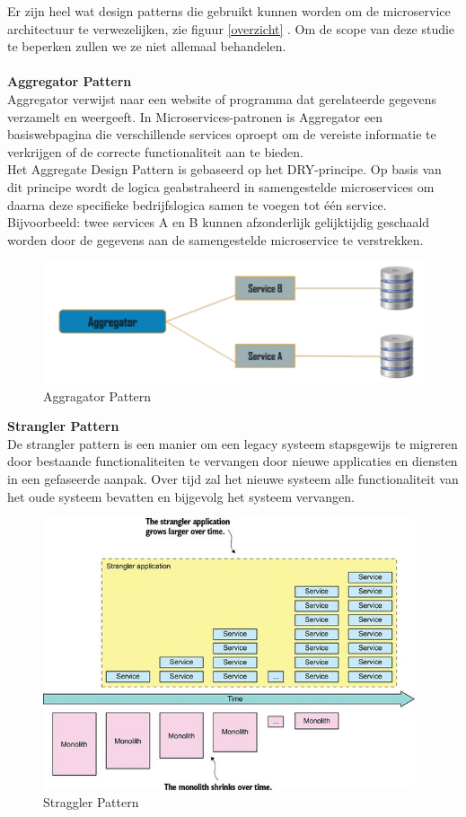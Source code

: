 Er zijn heel wat design patterns die gebruikt kunnen worden om de microservice architectuur te verwezelijken, zie figuur \ref{overzicht} . Om de scope van deze studie te beperken zullen we ze niet allemaal behandelen.\\ \\
\textbf{Aggregator Pattern}\\
Aggregator verwijst naar een website of programma dat gerelateerde gegevens verzamelt en weergeeft. In Microservices-patronen is Aggregator een basiswebpagina die verschillende services oproept om de vereiste informatie te verkrijgen of de correcte functionaliteit aan te bieden.\\
Het Aggregate Design Pattern is gebaseerd op het DRY-principe. Op basis van dit principe wordt de logica geabstraheerd in samengestelde microservices om daarna deze specifieke bedrijfslogica samen te voegen tot één service.
Bijvoorbeeld: twee services A en B kunnen afzonderlijk gelijktijdig geschaald worden door de gegevens aan de samengestelde microservice te verstrekken.

\begin{figure}[!htb]
    \centering
    \includegraphics[width=1\textwidth]{Aggregator.png}
    \caption{Aggragator Pattern \label{aggragator}}
\end{figure}

\textbf{Strangler Pattern}\\
De strangler pattern is een manier om een legacy systeem stapsgewijs te migreren door bestaande functionaliteiten te vervangen door nieuwe applicaties en diensten in een gefaseerde aanpak. Over tijd zal het nieuwe systeem alle functionaliteit van het oude systeem bevatten en bijgevolg het systeem vervangen.

\begin{figure}[!htb]
    \centering
    \includegraphics[height=8cm]{strangler.jpg}
    \caption{Straggler Pattern \label{stangler}}
\end{figure}

